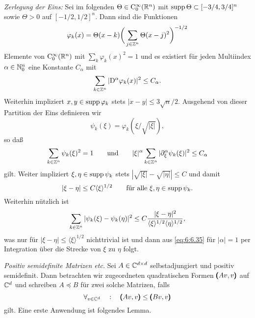 {\em Zerlegung der Eins:} Sei im folgenden $\Theta\in\mathrm C_0^\infty(\mathbb R^n)$ mit $\operatorname{supp}\Theta\subset [-3/4,3/4]^n$ sowie $\Theta>0$ auf $[-1/2,1/2]^n$. Dann sind die Funktionen
\begin{equation}
\varphi_k(x) = \Theta(x-k) \bigg(\sum_{j\in\mathbb Z^n} \Theta(x-j)^2\bigg)^{-1/2}
\end{equation}
Elemente von $\mathrm C_0^\infty(\mathbb R^n)$ mit $\sum_{k} \varphi_k(x)^2=1$ und es existiert für jeden Multiindex $\alpha\in\mathbb N_0^n$ eine Konstante $C_\alpha$ mit
\begin{equation}
    \sum_{k\in\mathbb Z^n} | \mathrm D^\alpha \varphi_k(x)|^2 \le C_\alpha.
\end{equation}
Weiterhin impliziert $x,y\in\operatorname{supp}\varphi_k$ stets $|x-y|\le 3\sqrt n/2$. Ausgehend von dieser Partition der Eins definieren wir
\begin{equation}
    \psi_k(\xi)= \varphi_k(\xi / \sqrt{|\xi|}), 
\end{equation}
so daß
\begin{equation}\label{eq:6:6.35} 
    \sum_{k\in\mathbb Z^n} \psi_k(\xi)^2 = 1\qquad\text{und}\qquad |\xi|^\alpha \sum_{k\in\mathbb Z^n} |\partial_\xi^\alpha \psi_k(\xi)|^2 \le C_\alpha
\end{equation}
gilt. Weiter impliziert $\xi,\eta\in\operatorname{supp}\psi_k$ stets $|\sqrt{|\xi|}-\sqrt{|\eta|}|\le C$ und damit 
\begin{equation}\label{eq:6:6.36}
 |\xi-\eta|\le C \langle\xi\rangle^{1/2} \qquad\text{für alle $\xi,\eta\in\operatorname{supp}\psi_k$}.
\end{equation}
Weiterhin nützlich ist
\begin{equation}\label{eq:6:6.37}
  \sum_{k\in\mathbb Z^n} |\psi_k(\xi)-\psi_k(\eta)|^2 \le C \frac{|\xi-\eta|^2}{ \langle\xi\rangle^{1/2} \langle\eta\rangle^{1/2}},
\end{equation} 
was nur für $|\xi-\eta|\le \langle\xi\rangle^{1/2}$ nichttrivial ist und dann aus \eqref{eq:6:6.35} für $|\alpha|=1$ per Integration über die Strecke von $\xi$ zu $\eta$ folgt.


{\em Positiv semidefinite Matrizen etc.}
Sei $A\in\mathbb C^{d\times d}$ selbstadjungiert und positiv semidefinit. Dann betrachten wir zugeordneten quadratischen Formen $\pmb(Av,v\pmb)$ auf $\mathbb C^d$ und  schreiben $A \preceq B$ für zwei solche Matrizen, falls 
\begin{equation}
   \forall_{v\in\mathbb C^d} \quad:\quad \pmb(Av,v\pmb)\le \pmb(Bv,v\pmb)
\end{equation}
gilt. Eine erste Anwendung ist folgendes Lemma.

